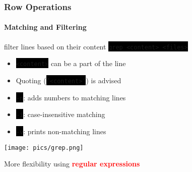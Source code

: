 \documentclass[unknownkeysallowed, 10pt, a4 paper, handout]{beamer}
\newcommand{\focus}[1]{\textbf{\textcolor{red}{#1}}}
\newcommand{\code}[1]{\colorbox{black}{\color{green}\texttt{#1}}}
\newcommand{\sidebyside}[5]{
  \begin{minipage}{#1\textwidth}
    #2
  \end{minipage} #3 \begin{minipage}{#4\textwidth}
    #5
  \end{minipage}
}
\begin{document}
\begin{frame}
  \frametitle{Row Operations}
  \framesubtitle{Matching and Filtering}

  \begin{block}{filter lines based on their content}
  \code{grep <content> <files>}
  \end{block}

  \sidebyside{0.59}{
      \begin{itemize}
        \item \code{<content>} can be a part of the line
        \item Quoting (\code{'<content>'}) is advised
        \item \code{-n}: adds numbers to matching lines
        \item \code{-i}: case-insensitive matching
        \item \code{-v}: prints non-matching lines
      \end{itemize}
  }{\hfill}{0.38}{
    \begin{center}
      \texttt{[image: pics/grep.png]}
    \end{center}
  }

  More flexibility using \focus{regular expressions}
\end{frame}
\end{document}
